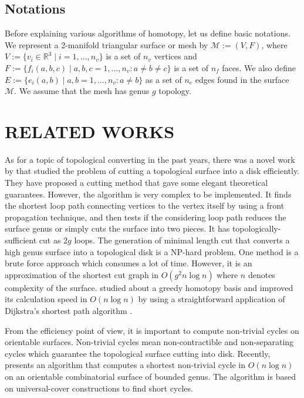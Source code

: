 \documentclass[a4paper,twoside]{article}
\begin{document}
\subsection*{Notations}
Before explaining various algorithms of homotopy, let us define basic notations. We represent a 2-manifold triangular surface or mesh by $\mathscr{M}:=(V,F)$, where $V:=\{ v_{i}\in \mathbb{R}^3 \mid i = 1, ... , n_v\}$ is a set of $n_v$ vertices and $F:=\{ f_{i}(a,b,c) \mid a,b,c = 1, ... , n_v : a \neq b \neq c\}$ is a set of $n_f$ faces. We also define $E:=\{ e_{i}(a,b) \mid a,b = 1, ... , n_v : a \neq b\}$ as a set of $n_e$ edges found in the surface $\mathscr{M}$. We assume that the mesh has genus $g$ topology. 


\section{\uppercase{Related Works}}
\label{sec:related works}
\noindent As for a topic of topological converting in the past years, there was a novel work  by \cite{Erickson:2002:OCS:513400.513430} that studied the problem of cutting a topological surface into a disk efficiently. They have proposed a cutting method that gave some elegant theoretical guarantees. However, the algorithm is very complex to be implemented. It finds the shortest loop path connecting vertices to the vertex itself by using a front propagation technique, and then tests if the considering loop path reduces the surface genus or simply cuts the surface into two pieces. It has topologically-sufficient cut as $2g$ loops. The generation of minimal length cut that converts a high genus surface into a topological disk is a NP-hard problem. One method is a brute force approach which consumes a lot of time. However, it is an approximation of the shortest cut graph in $O(g^2 n \log n)$ where $n$ denotes complexity of the surface. \cite{Erickson:2005:GOH:1070432.1070581} studied about a greedy homotopy basis and improved its calculation speed in $O(n \log n)$
by using a straightforward application of Dijkstra's shortest path algorithm \cite{Dijkstra59anote}. 

From the efficiency point of view, it is important to compute non-trivial cycles on orientable surfaces. Non-trivial cycles mean non-contractible and non-separating cycles which guarantee the topological surface cutting into disk. Recently, \cite{Kutz:2006:CSN:1137856.1137919} presents an algorithm that computes a shortest non-trivial cycle in $O(n \log n)$ on an orientable combinatorial surface of bounded genus. The algorithm is based on universal-cover constructions to find short cycles.
\end{document}

